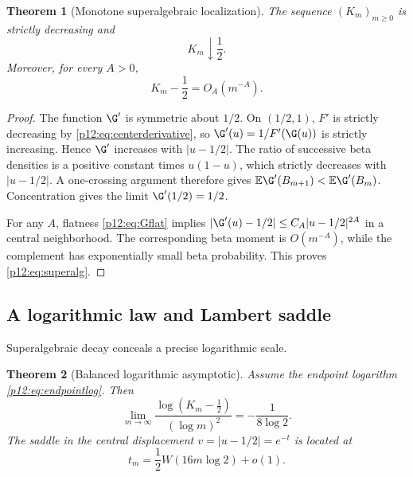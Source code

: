 \documentclass[11pt,oneside]{article}
\newtheorem{theorem}{Theorem}[section]
\theoremstyle{definition}
\theoremstyle{remark}
\newcommand{\F}{F}
\newcommand{\E}{\mathbb E}
\newcommand{\1}{\mathbf 1}
\begin{document}
\begin{theorem}[Monotone superalgebraic localization\tagnew]\label{p12:thm:Km}
The sequence \((K_m)_{m\ge0}\) is strictly decreasing and
\begin{equation}
 K_m\downarrow\frac12.
\end{equation}
Moreover, for every \(A>0\),
\begin{equation}\label{p12:eq:superalg}
 K_m-\frac12=O_A(m^{-A}).
\end{equation}
\end{theorem}

\begin{proof}
The function \(\G'\) is symmetric about \(1/2\).  On \((1/2,1)\),
\(\F'\) is strictly decreasing by \eqref{p12:eq:centerderivative}, so
\(\G'(u)=1/\F'(\G(u))\) is strictly increasing.  Hence \(\G'\) increases with
\(|u-1/2|\).  The ratio of successive beta densities is a positive constant
times \(u(1-u)\), which strictly decreases with \(|u-1/2|\).  A one-crossing
argument therefore gives \(\E\G'(B_{m+1})<\E\G'(B_m)\).  Concentration gives the
limit \(\G'(1/2)=1/2\).

For any \(A\), flatness \eqref{p12:eq:Gflat} implies
\(|\G'(u)-1/2|\le C_A|u-1/2|^{2A}\) in a central neighborhood.  The corresponding
beta moment is \(O(m^{-A})\), while the complement has exponentially small beta
probability.  This proves \eqref{p12:eq:superalg}.
\end{proof}

\subsection{A logarithmic law and Lambert saddle}

Superalgebraic decay conceals a precise logarithmic scale.

\begin{theorem}[Balanced logarithmic asymptotic\tagnew]\label{p12:thm:Klog}
Assume the endpoint logarithm \eqref{p12:eq:endpointlog}.  Then
\begin{equation}\label{p12:eq:Klog}
 \boxed{
 \lim_{m\to\infty}
 \frac{\log(K_m-\tfrac12)}{(\log m)^2}
 =-\frac1{8\log2}.}
\end{equation}
The saddle in the central displacement \(v=|u-1/2|=e^{-t}\) is located at
\begin{equation}\label{p12:eq:LambertSaddle}
 t_m=\frac12W(16m\log2)+o(1).
\end{equation}
\end{theorem}
\end{document}
